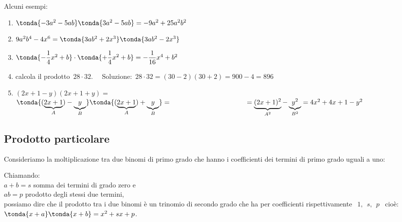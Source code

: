 \begin{esempio}{}{}
Alcuni esempi:
\begin{enumerate}
\item \(\tonda{-3a^{2}-5{ab}} \tonda{3a^{2}-5{ab}}=-9a^{2}+25a^{2}b^{2}\)
\item \(9a^2b^4-4x^6 = \tonda{3ab^{2}+2x^3} \tonda{3ab^{2}-2x^3}\)
\item \(\tonda{-{\dfrac{1}{4}}x^{2}+b}\cdot \tonda{+{\dfrac{1}{4}}x^{2}+b}=
        -\dfrac{1}{16}x^{4}+b^{2}\)
\item calcola il prodotto~\(28 \cdot 32\).~~
Soluzione:~\(28\cdot 32=(30-2)(30+2)=900-4=896\)
\item \((2x+1-y)(2x+1+y)=\)
\(\tonda{(\underbrace{2x+1}_{A})-\underbrace{y}_{B}}
  \tonda{(\underbrace{2x+1}_{A})+\underbrace{y}_{B}}= \newline
\hspace*{38mm}
=\underbrace{(2x+1)^{2}}_{A^{2}}-\underbrace{y^{2}}_{B^{2}}=
4x^{2}+4x+1-y^{2}\)
\end{enumerate}
\end{esempio}



\subsection{Prodotto particolare}
\label{subsec:prodnot_particolare}

Consideriamo la moltiplicazione tra due binomi di primo grado che hanno 
i coefficienti dei termini di primo grado uguali a 
uno:


Chiamando:\\
\(a+b=s\) \quad somma dei termini di grado zero e\\
\(ab=p\) \quad prodotto degli stessi due termini,\\
possiamo dire che il prodotto tra i due binomi è un trinomio di secondo 
grado che ha per coefficienti rispettivamente 
\(~~ 1, ~~ s,~~ p\) ~cioè:~~
\(\tonda{x +a} \tonda{x+b} = x^2 +sx +p\).

